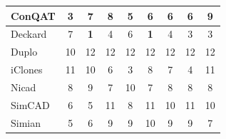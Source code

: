 \documentclass[review]{elsarticle}
\begin{document}
\begin{table}[]
\begin{tabular}{lcccccccc}
\multicolumn{1}{|l|}{ConQAT}            & \multicolumn{1}{c|}{3}               & \multicolumn{1}{c|}{7}                 & \multicolumn{1}{c|}{8}              & \multicolumn{1}{c|}{5}              & \multicolumn{1}{c|}{6}                & \multicolumn{1}{c|}{6}               & \multicolumn{1}{c|}{6}              & \multicolumn{1}{c|}{9}            \\ \hline
\multicolumn{1}{|l|}{Deckard}           & \multicolumn{1}{c|}{7}               & \multicolumn{1}{c|}{\textbf{1}}        & \multicolumn{1}{c|}{4}              & \multicolumn{1}{c|}{6}              & \multicolumn{1}{c|}{\textbf{1}}       & \multicolumn{1}{c|}{4}               & \multicolumn{1}{c|}{3}              & \multicolumn{1}{c|}{3}            \\ \hline
\multicolumn{1}{|l|}{Duplo}             & \multicolumn{1}{c|}{10}              & \multicolumn{1}{c|}{12}                & \multicolumn{1}{c|}{12}             & \multicolumn{1}{c|}{12}             & \multicolumn{1}{c|}{12}               & \multicolumn{1}{c|}{12}              & \multicolumn{1}{c|}{12}             & \multicolumn{1}{c|}{12}           \\ \hline
\multicolumn{1}{|l|}{iClones}           & \multicolumn{1}{c|}{11}              & \multicolumn{1}{c|}{10}                & \multicolumn{1}{c|}{6}              & \multicolumn{1}{c|}{3}              & \multicolumn{1}{c|}{8}                & \multicolumn{1}{c|}{7}               & \multicolumn{1}{c|}{4}              & \multicolumn{1}{c|}{11}           \\ \hline
\multicolumn{1}{|l|}{Nicad}             & \multicolumn{1}{c|}{8}               & \multicolumn{1}{c|}{9}                 & \multicolumn{1}{c|}{7}              & \multicolumn{1}{c|}{10}             & \multicolumn{1}{c|}{7}                & \multicolumn{1}{c|}{8}               & \multicolumn{1}{c|}{8}              & \multicolumn{1}{c|}{8}            \\ \hline
\multicolumn{1}{|l|}{SimCAD}            & \multicolumn{1}{c|}{6}               & \multicolumn{1}{c|}{5}                 & \multicolumn{1}{c|}{11}             & \multicolumn{1}{c|}{8}              & \multicolumn{1}{c|}{11}               & \multicolumn{1}{c|}{10}              & \multicolumn{1}{c|}{11}             & \multicolumn{1}{c|}{10}           \\ \hline
\multicolumn{1}{|l|}{Simian}            & \multicolumn{1}{c|}{5}               & \multicolumn{1}{c|}{6}                 & \multicolumn{1}{c|}{9}              & \multicolumn{1}{c|}{9}              & \multicolumn{1}{c|}{10}               & \multicolumn{1}{c|}{9}               & \multicolumn{1}{c|}{9}              & \multicolumn{1}{c|}{7}            \\ \hline

\end{tabular}
\end{table}
\end{document}

